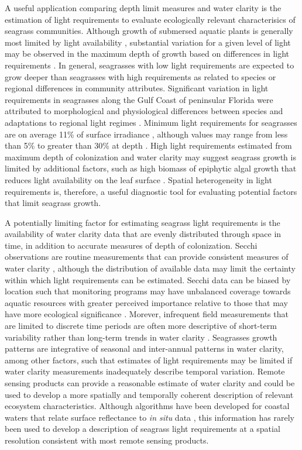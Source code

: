 \documentclass[letterpaper,12pt,oneside]{article}\usepackage[]{graphicx}\usepackage[]{color}
\begin{document}
A useful application comparing depth limit measures and water clarity is the estimation of light requirements to evaluate ecologically relevant characterisics of seagrass communities.  Although growth of submersed aquatic plants is generally most limited by light availability \citep{Barko82,Hall90,Dennison93}, substantial variation for a given level of light may be observed in the maximum depth of growth based on differences in light requirements \citep{Dennison93,Choice14}.  In general, seagrasses with low light requirements are expected to grow deeper than seagrasses with high requirements as related to species or regional differences in community attributes.  Significant variation in light requirements in seagrasses along the Gulf Coast of peninsular Florida were attributed to morphological and physiological differences between species and adaptations to regional light regimes \citep{Choice14}.  Minimum light requirements for seagrasses are on average 11\% of surface irradiance \citep{Duarte91}, although values may range from less than 5\% to greater than 30\% at depth \citep{Dennison93}. High light requirements estimated from maximum depth of colonization and water clarity may suggest seagrass growth is limited by additional factors, such as high biomass of epiphytic algal growth that reduces light availability on the leaf surface \citep{Kemp04}. Spatial heterogeneity in light requirements is, therefore, a useful diagnostic tool for evaluating potential factors that limit seagrass growth. 

A potentially limiting factor for estimating seagrass light requirements is the availability of water clarity data that are evenly distributed through space in time, in addition to accurate measures of depth of colonization.  Secchi observations are routine measurements that can provide consistent measures of water clarity , although the distribution of available data may limit the certainty within which light requirements can be estimated.  Secchi data can be biased by location such that monitoring programs may have unbalanced coverage towards aquatic resources with greater perceived importance relative to those that may have more ecological significance \citep{Wagner08,Lottig14}.  Morever, infrequent field measurements that are limited to discrete time periods are often more descriptive of short-term variability rather than long-term trends in water clarity \citep{Elsdon09}.  Seagrasses growth patterns are integrative of seasonal and inter-annual patterns in water clarity, among other factors, such that estimates of light requirements may be limited if water clarity measurements inadequately describe temporal variation.  Remote sensing products can provide a reasonable estimate of water clarity and could be used to develop a more spatially and temporally coherent description of relevant ecosystem characteristics.  Although algorithms have been developed for coastal waters that relate surface reflectance to \textit{in situ} data \citep{Woodruff99,Chen07}, this information has rarely been used to develop a description of seagrass light requirements at a spatial resolution consistent with most remote sensing products.    
\end{document}

